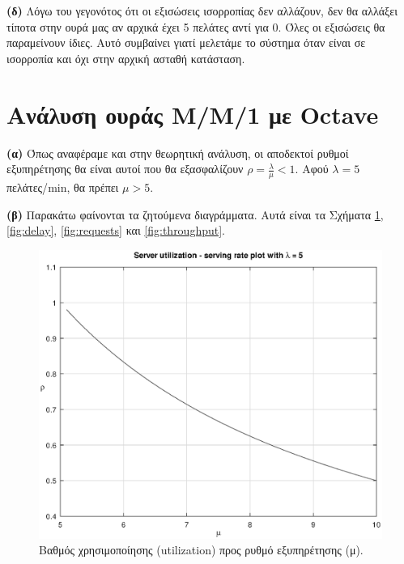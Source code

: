 \documentclass {article}
\begin{document}
\textbf{(δ)} Λόγω του γεγονότος ότι οι εξισώσεις ισορροπίας δεν αλλάζουν, δεν θα αλλάξει τίποτα στην ουρά μας αν αρχικά έχει 5 πελάτες αντί για 0. Όλες οι εξισώσεις θα παραμείνουν ίδιες. Αυτό συμβαίνει γιατί μελετάμε το σύστημα όταν είναι σε ισορροπία και όχι στην αρχική ασταθή κατάσταση.

\section*{Ανάλυση ουράς Μ/Μ/1 με \foreignlanguage{english}{Octave}}

\textbf{(α)} Όπως αναφέραμε και στην θεωρητική ανάλυση, οι αποδεκτοί ρυθμοί εξυπηρέτησης θα είναι αυτοί που θα εξασφαλίζουν $ρ = \frac{λ}{μ} < 1$. Αφού $λ = 5$ πελάτες/\foreignlanguage{english}{min}, θα πρέπει $μ > 5$.

\textbf{(β)} Παρακάτω φαίνονται τα ζητούμενα διαγράμματα. Αυτά είναι τα Σχήματα \ref{fig:util}, \ref{fig:delay}, \ref{fig:requests} και \ref{fig:throughput}.

\begin{figure}[ht]
	\includegraphics[width=\linewidth] {M-M-1_Util_SrvRate}
	\caption{Βαθμός χρησιμοποίησης \foreignlanguage{english}{(utilization)} προς ρυθμό εξυπηρέτησης (μ).}
	\label{fig:util}
\end{figure}
\end{document}

